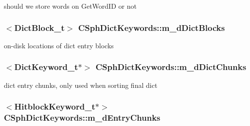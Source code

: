 should we store words on Get\-Word\-I\-D or not 

\hypertarget{classCSphDictKeywords_a5b0459374d93201a8d2fc4a169c44119}{
\subsubsection[{m\-\_\-d\-Dict\-Blocks}]{$<${\bf Dict\-Block\-\_\-t}$>$ C\-Sph\-Dict\-Keywords\-::m\-\_\-d\-Dict\-Blocks\hspace{0.3cm}{\ttfamily [private]}}}\label{classCSphDictKeywords_a5b0459374d93201a8d2fc4a169c44119}


on-\/disk locations of dict entry blocks 

\hypertarget{classCSphDictKeywords_a057492051773da1dc28351efaf14fb28}{
\subsubsection[{m\-\_\-d\-Dict\-Chunks}]{$<${\bf Dict\-Keyword\-\_\-t}$\ast$$>$ C\-Sph\-Dict\-Keywords\-::m\-\_\-d\-Dict\-Chunks\hspace{0.3cm}{\ttfamily [private]}}}\label{classCSphDictKeywords_a057492051773da1dc28351efaf14fb28}


dict entry chunks, only used when sorting final dict 

\hypertarget{classCSphDictKeywords_a10672cecefb227fec7ee87fc876b3343}{
\subsubsection[{m\-\_\-d\-Entry\-Chunks}]{$<${\bf Hitblock\-Keyword\-\_\-t}$\ast$$>$ C\-Sph\-Dict\-Keywords\-::m\-\_\-d\-Entry\-Chunks\hspace{0.3cm}{\ttfamily [private]}}}\label{classCSphDictKeywords_a10672cecefb227fec7ee87fc876b3343}



